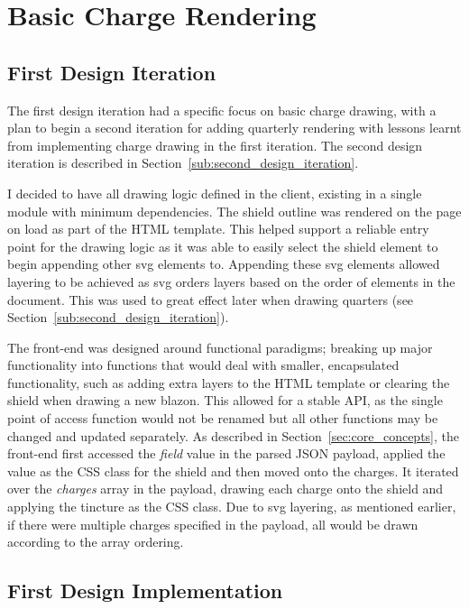 \documentclass[nobib, a4paper, twoside, justified]{tufte-book}
\makeatletter
\newcommand{\svg}{\gls{svg}\@\xspace}
\newcommand{\charge}{\gls{charge}\@\xspace}
\newcommand{\charges}{\glspl{charge}\@\xspace}
\newcommand{\blazon}{\gls{blazon}\@\xspace}
\newcommand{\payload}{\gls{payload}\@\xspace}
\makeatother
\begin{document}
\section{Basic Charge Rendering}%
\label{sub:basic_charge_rendering}

\subsection{First Design Iteration}%
\label{sub:first_design_iteration}

The first design iteration had a specific focus on basic \charge{} drawing, with a plan to begin a
second iteration for adding quarterly rendering with lessons learnt from implementing \charge{}
drawing in the first iteration. The second design iteration is described in
Section~\ref{sub:second_design_iteration}.

I decided to have all drawing logic defined in the client, existing in a single module with minimum
dependencies. The shield outline was rendered on the page on load as part of the HTML template.
This helped support a reliable entry point for the drawing logic as it was able to easily select
the shield element to begin appending other \svg{} elements to. Appending these \svg{} elements
allowed layering to be achieved as \svg{} orders layers based on the order of elements in the
document. This was used to great effect later when drawing quarters (see
Section~\ref{sub:second_design_iteration}).

The front-end was designed around functional paradigms; breaking up major functionality into
functions that would deal with smaller, encapsulated functionality, such as adding extra layers to
the HTML template or clearing the shield when drawing a new \blazon. This allowed for a stable API,
as the single point of access function would not be renamed but all other functions may be changed
and updated separately. As described in Section~\ref{sec:core_concepts}, the front-end first
accessed the \textit{field} value in the parsed JSON \payload, applied the value as the CSS class
for the shield and then moved onto the \charges{}. It iterated over the \textit{\charges{}} array
in the \payload, drawing each \charge{} onto the shield and applying the tincture as the CSS class.
Due to \svg{} layering, as mentioned earlier, if there were multiple \charges{} specified in the
\payload, all would be drawn according to the array ordering.

\subsection{First Design Implementation}%
\label{sub:first_design_implementation}
\end{document}
